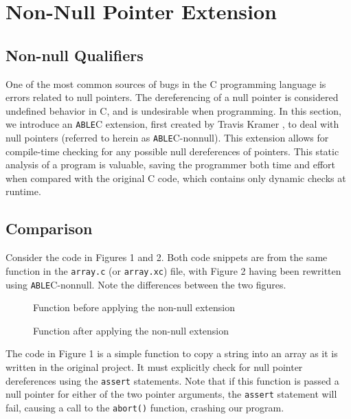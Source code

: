 \documentclass[main.tex]{subfiles}
\begin{document}
\section{Non-Null Pointer Extension}

\subsection{Non-null Qualifiers}
One of the most common sources of bugs in the C programming language is errors
related to null pointers. The dereferencing of a null pointer is considered
undefined behavior in C, and is undesirable when programming. In this section, we introduce an \verb|ABLE|C extension,
first created by Travis Kramer \cite{7}, to
deal with null pointers (referred to herein as \verb|ABLE|C-nonnull). This extension allows for compile-time
checking for any possible null dereferences of pointers. This static analysis of a program is valuable, saving
the programmer both time and effort when compared with the original C code, which contains only dynamic checks
at runtime. 

\subsection{Comparison}

Consider the code in Figures 1 and 2. Both code snippets are from the same function in the \verb|array.c| (or \verb|array.xc|) file,
with Figure 2 having been rewritten using \verb|ABLE|C-nonnull. Note the differences between the two figures.

\begin{figure}[h]

\caption{Function before applying the non-null extension}
\end{figure}
\begin{figure}[h]

\caption{Function after applying the non-null extension}
\end{figure}

The code in Figure 1 is a simple function to copy a string into an array as it is written in the original project. It must explicitly
check for null pointer dereferences using the \verb|assert| statements. Note that if this function is passed a null pointer for either
of the two pointer arguments, the \verb|assert| statement will fail, causing a call to the \verb|abort()| function, crashing our
program.
\end{document}
